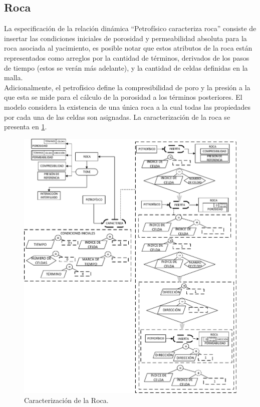 
\subsection{Roca}\label{sec:PS_Rock}

La especificación de la relación dinámica ``Petrofísico caracteriza roca'' consiste de insertar las condiciones iniciales de porosidad y permeabilidad absoluta para la roca asociada al yacimiento, es posible notar que estos atributos de la roca están representados como arreglos por la cantidad de términos, derivados de los pasos de tiempo (estos se verán más adelante), y la cantidad de celdas definidas en la malla. \\
Adicionalmente, el petrofísico define la compresibilidad de poro y la presión a la que esta se mide para el cálculo de la porosidad a los términos posteriores. El modelo considera la existencia de una única roca a la cual todas las propiedades por cada una de las celdas son asignadas. La caracterización de la roca se presenta en \ref{fig:Rock}.\\

\begin{figure}[h]
	\centering%
	\includegraphics[width=0.90\linewidth]{Kap4/Rock.pdf}%
	\caption{Caracterización de la Roca.} \label{fig:Rock}
\end{figure}

